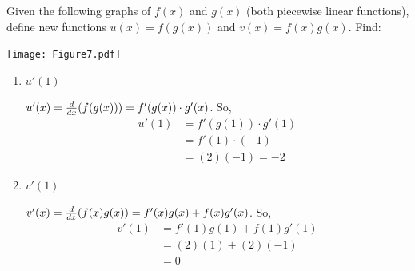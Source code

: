 \documentclass[nooutcomes]{ximera}
\begin{document}
\begin{problem}
  Given the following graphs of $f(x)$ and $g(x)$ (both piecewise
  linear functions), define new functions $u(x) = f(g(x))$ and
  $v(x) = f(x)g(x)$.  Find:

  \begin{image}
    \texttt{[image: Figure7.pdf]}
  \end{image}

  \begin{enumerate}
	
  \item $u'(1)$
    \begin{freeResponse}
      $u'(x) = \frac{d}{dx}(f(g(x))) = f'(g(x)) \cdot g'(x)$.  So,
      \begin{align*}
        u'(1) &= f'(g(1)) \cdot g'(1) \\
              &= f'(1) \cdot (-1) \\
              &= (2)(-1) = -2 
      \end{align*}  
    \end{freeResponse}
		
		
		
	
  \item $v'(1)$
    \begin{freeResponse}
      $v'(x) = \frac{d}{dx}(f(x)g(x)) = f'(x)g(x) + f(x)g'(x)$.  So,
      \begin{align*}
        v'(1) &= f'(1) g(1) + f(1) g'(1) \\
              &= (2)(1) + (2)(-1) \\
              &= 0
      \end{align*}
    \end{freeResponse}
  \end{enumerate}		
			
		
\end{problem}
	
	
	
		
			
\end{document}
